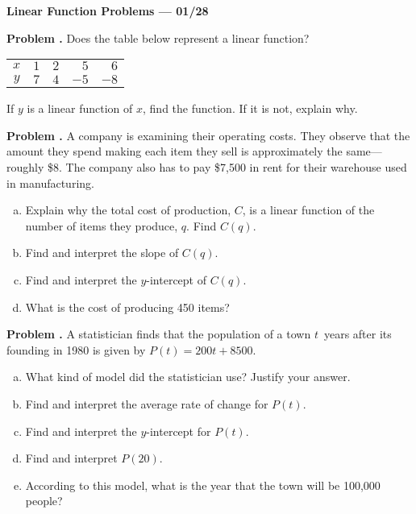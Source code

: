\documentclass[11pt,letterpaper]{article}
\newcounter{problem}
\newcommand{\prob}{\stepcounter{problem}%
\noindent\textbf{Problem \theproblem. }}
\newcommand{\pspace}{\par\vspace{\baselineskip}}
\begin{document}

\begin{center} {\bfseries \LARGE Linear Function Problems --- 01/28} \end{center} \par\vspace{0.2\baselineskip}

\prob Does the table below represent a linear function? \par
	\begin{table}[ht]
	\centering
	\begin{tabular}{|c||rrrr|} \hline
	$x$ & $1$ & $2$ & $5$ & $6$ \\
	$y$ & $7$ & $4$ & $-5$ & $-8$ \\ \hline
	\end{tabular}
	\end{table} \par
If $y$ is a linear function of $x$, find the function. If it is not, explain why. \pspace



\prob A company is examining their operating costs. They observe that the amount they spend making each item they sell is approximately the same---roughly \$8. The company also has to pay \$7,500 in rent for their warehouse used in manufacturing. 
	\begin{enumerate}[(a)]
	\item Explain why the total cost of production, $C$, is a linear function of the number of items they produce, $q$. Find $C(q)$.
	\item Find and interpret the slope of $C(q)$.
	\item Find and interpret the $y$-intercept of $C(q)$.
	\item What is the cost of producing 450 items?
	\end{enumerate} \pspace


\prob A statistician finds that the population of a town $t$~years after its founding in 1980 is given by $P(t)= 200t + 8500$. 
	\begin{enumerate}[(a)]
	\item What kind of model did the statistician use? Justify your answer.
	\item Find and interpret the average rate of change for $P(t)$.
	\item Find and interpret the $y$-intercept for $P(t)$.
	\item Find and interpret $P(20)$.
	\item According to this model, what is the year that the town will be 100,000 people?
	\end{enumerate} \pspace
\end{document}

